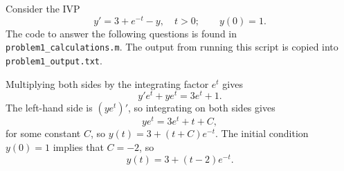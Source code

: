 \documentclass{homework}
\begin{document}
	\maketitle
	
	\question 
	
	Consider the IVP
	\begin{equation}
		y' = 3 + e^{-t} - y, \quad t > 0; \qquad y(0) = 1.
	\end{equation}
	The code to answer the following questions is found in \lstinline{problem1_calculations.m}. The output from running this script is copied into \lstinline{problem1_output.txt}.
	
	\begin{arabicparts}
		\questionpart Multiplying both sides by the integrating factor $e^t$ gives
		\begin{equation}
			y'e^t + ye^t = 3e^t + 1.
		\end{equation}
		The left-hand side is $(ye^t)'$, so integrating on both sides gives
		\begin{equation}
			ye^t = 3e^t + t + C,
		\end{equation}
		for some constant $C$, so $y(t) = 3 + (t + C)e^{-t}$. The initial condition $y(0) = 1$ implies that $C = -2$, so
		\begin{equation}
			y(t) = 3 + (t-2)e^{-t}.
		\end{equation}
		

\end{arabicparts}
\end{document}
